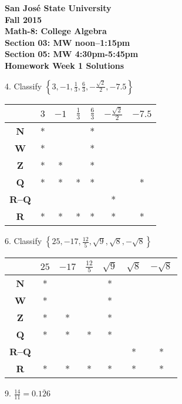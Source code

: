 \documentclass[letterpaper]{article}
\begin{document}
\begin{center}
\bfseries
San Jos\'{e} State University \\
Fall 2015 \\
Math-8: College Algebra \\
Section 03: MW noon--1:15pm \\
Section 05: MW 4:30pm-5:45pm \\
\bigskip
Homework Week 1 Solutions
\end{center}

\bigskip

4. Classify $\left\{ 3, -1, \frac{1}{3}, \frac{6}{3}, -\frac{\sqrt{2}}{2}, -7.5
\right\}$

\bigskip

\begin{tabular}{|c|c|c|c|c|c|c|}
\hline
& $3$ & $-1$ & $\frac{1}{3}$ & $\frac{6}{3}$ & $-\frac{\sqrt{2}}{2}$ & $-7.5$ \\
\hline
\textbf{N} & * & & & * & & \\
\hline
\textbf{W} & * & & & * & & \\
\hline
\textbf{Z} & * & * & & * & & \\
\hline
\textbf{Q} & * & * & * & * & & * \\
\hline
\textbf{R--Q} & & & & & * & \\
\hline
\textbf{R} & * & * & * & * & * & * \\
\hline
\end{tabular}

\bigskip

6. Classify $\left\{ 25, -17, \frac{12}{5}, \sqrt{9}, \sqrt{8}, -\sqrt{8}
\right\}$

\bigskip

\begin{tabular}{|c|c|c|c|c|c|c|}
\hline
& $25$ & $-17$ & $\frac{12}{5}$ & $\sqrt{9}$ & $\sqrt{8}$ & $-\sqrt{8}$ \\
\hline
\textbf{N} & * & & & * & & \\
\hline
\textbf{W} & * & & & * & & \\
\hline
\textbf{Z} & * & * & & * & & \\
\hline
\textbf{Q} & * & * & * & * & & \\
\hline
\textbf{R--Q} & & & & & * & * \\
\hline
\textbf{R} & * & * & * & * & * & * \\
\hline
\end{tabular}

\bigskip

9. $\frac{14}{11} = 0.\overline{126}$
\end{document}
